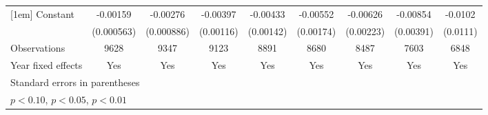 \begin{table}[htbp]
\begin{tabular}{l*{8}{c}}
[1em]
Constant            &    -0.00159\sym{***}&    -0.00276\sym{***}&    -0.00397\sym{***}&    -0.00433\sym{***}&    -0.00552\sym{***}&    -0.00626\sym{***}&    -0.00854\sym{**} &     -0.0102         \\
                    &  (0.000563)         &  (0.000886)         &   (0.00116)         &   (0.00142)         &   (0.00174)         &   (0.00223)         &   (0.00391)         &    (0.0111)         \\
\hline
Observations        &        9628         &        9347         &        9123         &        8891         &        8680         &        8487         &        7603         &        6848         \\
Year fixed effects           &           Yes        &     Yes          &    Yes          &   Yes         &     Yes          &     Yes           &    Yes          &    Yes         \\
\hline\hline
\multicolumn{9}{l}{\footnotesize Standard errors in parentheses}\\
\multicolumn{9}{l}{\footnotesize \sym{*} \(p<0.10\), \sym{**} \(p<0.05\), \sym{***} \(p<0.01\)}\\
\end{tabular}
\end{table}
